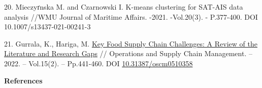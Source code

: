 \begin{references}
20. Mieczyґnska M. and Czarnowski I. K-means clustering for SAT-AIS data
analysis //WMU Journal of Maritime Affairs. -2021. -Vol.20(3). -
P.377-400. DOI 10.1007/s13437-021-00241-3

21. Gurrala, K., Hariga, M.
\href{https://journal.oscm-forum.org/publication/article/key-food-supply-chain-challenges-a-review-of-the-literature-and-research-gaps}{Key
Food Supply Chain Challenges: A Review of the Literature and Research
Gaps} // Operations and Supply Chain Management. -- 2022. -- Vol.15(2).
-- Pp.441-460. DOI
\href{http://doi.org/10.31387/oscm0510358}{10.31387/oscm0510358}
\end{references}

\begin{center}
{\bfseries References}
\end{center}

